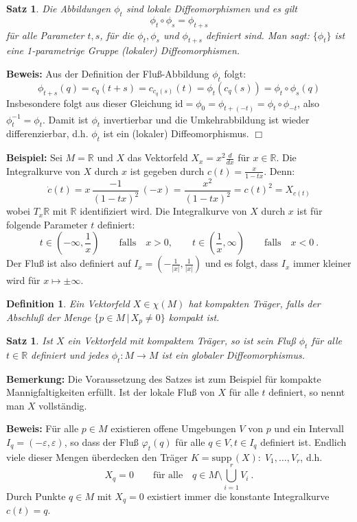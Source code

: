 \documentclass[12pt,a4paper]{article}
\def\R{\mathbb{R}}
\def\id{\mathrm{id}}
\def\supp{\mathrm{supp}\,}
\newtheorem{Satz}[Lemma]{Satz}
\newtheorem{Definition}[Lemma]{Definition}
\def\proof{\noindent\textbf{Beweis:}\quad}
\def\qed{\quad\hfill\ensuremath{\Box}}
\begin{document}
\begin{Satz}
Die Abbildungen $\phi_t$ sind lokale Diffeomorphismen und es gilt
$$
\phi_t \circ \phi_s = \phi_{t+s}
$$
f\"ur alle Parameter $t,s$, f\"ur die $\phi_t, \phi_s$ und $\phi_{t+s}$
definiert sind.
Man sagt: $\{\phi_t\}$ ist eine {\it 1-parametrige Gruppe} (lokaler)
Diffeomorphismen.
\end{Satz}
\proof
Aus der Definition der Flu\ss -Abbildung $\phi_t$ folgt:
$$
\phi_{t+s}(q) = c_q(t+s)= c_{c_q(s)}(t) = \phi_t(c_q(s)) = \phi_t \circ \phi_s (q)
$$
Insbesondere folgt aus dieser Gleichung $\id = \phi_0 = \phi_{t + (-t)} = \phi_t \circ \phi_{-t}$,
also $\phi_t^{-1}= \phi_t$. Damit ist $\phi_t$ invertierbar und die Umkehrabbildung ist wieder
differenzierbar, d.h. $\phi_t$ ist ein (lokaler) Diffeomorphismus.
\qed

\bigskip

{\bf Beispiel:}
Sei $M= \R$ und $X$ das Vektorfeld $X_x = x^2 \frac{d}{dx}$ f\"ur $x\in \R$. Die Integralkurve
von $X$ durch $x$ ist gegeben durch
$
c(t) = \frac{x}{1-tx}
$. Denn:
$$
\dot c (t) = x \, \frac{-1}{(1-tx)^2}\,(-x)= \frac{x^2}{(1-tx)^2}= c(t)^2 = X_{c(t)}
$$
wobei $T_x\R$ mit $\R$ identifiziert wird. Die Integralkurve von $X$ durch $x$ ist f\"ur
folgende Parameter $t$ definiert:
$$
t \in (-\infty, \frac1x) \qquad \mbox{falls}\quad x >0, \qquad
t \in (\frac1x, \infty) \qquad \mbox{falls}\quad x <0 \ .
$$
Der Flu\ss{} ist also definiert auf $I_x=(-\frac1{|x|},\frac1{|x|})$ und es
folgt, dass $I_x$ immer kleiner wird f\"ur $x\mapsto \pm\infty$.

\bigskip

\begin{Definition}
Ein Vektorfeld $X\in \chi(M)$ hat kompakten Tr\"ager, falls der Abschlu\ss{} der
Menge $\{p\in M \,|\, X_p\neq 0 \}$ kompakt ist.
\end{Definition}

\bigskip

\begin{Satz}
Ist $X$ ein Vektorfeld mit kompaktem Tr\"ager, so ist sein Flu\ss{} $\phi_t$
f\"ur alle $t\in \R$ definiert und jedes $\phi_t:M\rightarrow M$ ist ein
globaler Diffeomorphismus.
\end{Satz}

{\bf Bemerkung:} Die Voraussetzung des Satzes ist zum Beispiel f\"ur kompakte
Mannigfaltigkeiten erf\"ullt. Ist der lokale Flu\ss{} von $X$ f\"ur alle $t$
definiert, so nennt man $X$ vollst\"andig.

\bigskip

\proof
F\"ur alle $p\in M$ existieren offene Umgebungen $V$ von $p$ und ein Intervall
$I_q= (-\varepsilon, \varepsilon)$, so dass der Flu\ss{} $\varphi_t(q)$ f\"ur alle
$q\in V, t \in I_q$ definiert ist. Endlich viele dieser Mengen \"uberdecken den
Tr\"ager $K=\supp(X): \; V_1,\ldots, V_r$, d.h.
$$
X_q = 0 \qquad \mbox{f\"ur alle}\quad q \in M \setminus \bigcup^r_{i=1} V_i \ .
$$
Durch Punkte $q\in M$ mit  $X_q=0$ existiert immer die konstante Integralkurve
$c(t)=q$.
\end{document}
